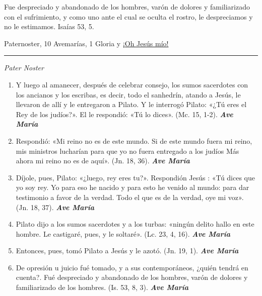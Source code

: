 \documentclass[a4paper,11pt, oneside]{report}
\begin{document}
{{      \smallskip
      Fue despreciado y abandonado de los hombres, varón de dolores y familiarizado con el sufrimiento, y como uno ante el cual
      se oculta el rostro, le despreciamos y no le estimamos. Isaías 53, 5.      
    
       Paternoster, 10 Avemarías, 1 Gloria y \hyperlink{finalFlagelacion}{¡Oh Jesús mío!}

      \medskip

      \begin{center}\rule{1\linewidth}{\linethickness}\end{center}

      \medskip
      \textit{Pater Noster}

      \begin{enumerate}
        
        \item Y luego al amanecer, después de celebrar consejo, los sumos sacerdotes con los ancianos y los escribas, es decir, todo el sanhedrín, atando a Jesús,
        le llevaron de allí y le entregaron a Pilato. Y le interrogó Pilato: «¿Tú eres el Rey de los judíos?». El le respondió: «Tú lo dices». (Mc. 15, 1-2). \textbf{\textit{Ave María}}

        \item Respondió: «Mi reino no es de este mundo. Si de este mundo fuera mi reino, mis ministros lucharían para que yo no fuera entregado a los judíos
        Más ahora mi reino no es de aquí». (Jn. 18, 36). \textbf{\textit{Ave María}}

        \item Díjole, pues, Pilato: «¿luego, rey eres tu?». Respondión Jesús : «Tú dices que yo soy rey. Yo para eso he nacido y para esto he venido
        al mundo: para dar testimonio a favor de la verdad. Todo el que es de la verdad, oye mi voz». (Jn. 18, 37). \textbf{\textit{Ave María}}

        \item Pilato dijo a los sumos sacerdotes y a los turbas: «ningún delito hallo en este hombre. 
        Le castigaré, pues, y le soltaré». (Lc. 23, 4, 16). \textbf{\textit{Ave María}}

        \item Entonces, pues, tomó Pilato a Jesús y le azotó. (Jn. 19, 1). \textbf{\textit{Ave María}}

        \item De opresión u juicio fué tomado, y a sus contemporáneos, ¿quién tendrá en cuenta?. Fué despreciado y abandonado de los hombres,
        varón de dolores y familiarizado de los hombres. (Is. 53, 8, 3). \textbf{\textit{Ave María}}


\end{enumerate}}}
\end{document}
